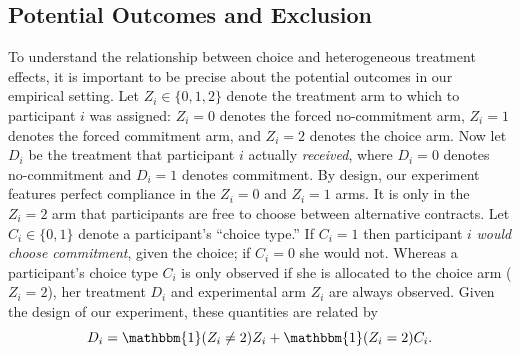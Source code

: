 \documentclass[oneside,11pt]{article}
\begin{document}
\subsection{Potential Outcomes and Exclusion}
\label{sec:potentialOutcomes}

To understand the relationship between choice and heterogeneous treatment effects, it is important to be precise about the potential outcomes in our empirical setting.
Let $Z_i \in \{0, 1, 2\}$ denote the treatment arm to which to participant $i$ was assigned: $Z_i = 0$ denotes the forced no-commitment arm, $Z_i = 1$ denotes the forced commitment arm, and $Z_i = 2$ denotes the choice arm. 
Now let $D_i$ be the treatment that participant $i$ actually \emph{received}, where $D_i = 0$ denotes no-commitment and $D_i = 1$ denotes commitment. 
By design, our experiment features perfect compliance in the $Z_i = 0$ and $Z_i = 1$ arms. 
It is only in the $Z_i = 2$ arm that participants are free to choose between alternative contracts. 
Let $C_i \in \{0, 1 \}$ denote a participant's ``choice type.'' If $C_i = 1$ then participant $i$ \emph{would choose commitment}, given the choice; if $C_i = 0$ she would not. 
Whereas a participant's choice type $C_i$ is only observed if she is allocated to the choice arm ($Z_i = 2$), her treatment $D_i$ and experimental arm $Z_i$ are always observed. 
Given the design of our experiment, these quantities are related by
\begin{equation}
D_i = \mathbbm{1}(Z_i \neq 2) Z_i + \mathbbm{1}(Z_i = 2) C_i.
\label{eq:potentialTreatments}
\end{equation}
\end{document}
